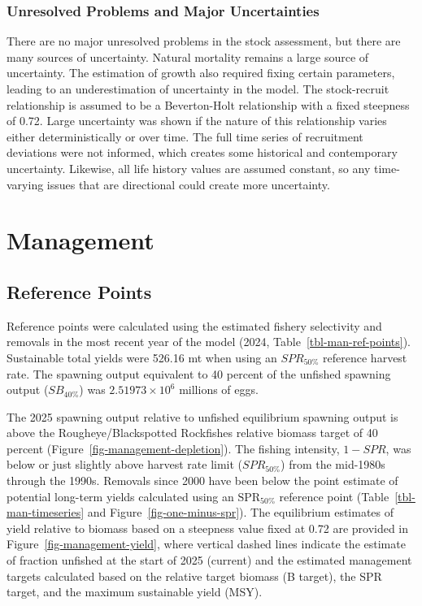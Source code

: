\documentclass[
]{scrartcl}
\begin{document}
\subsubsection{Unresolved Problems and Major
Uncertainties}\label{unresolved-problems-and-major-uncertainties-1}

There are no major unresolved problems in the stock assessment, but
there are many sources of uncertainty. Natural mortality remains a large
source of uncertainty. The estimation of growth also required fixing
certain parameters, leading to an underestimation of uncertainty in the
model. The stock-recruit relationship is assumed to be a Beverton-Holt
relationship with a fixed steepness of 0.72. Large uncertainty was shown
if the nature of this relationship varies either deterministically or
over time. The full time series of recruitment deviations were not
informed, which creates some historical and contemporary uncertainty.
Likewise, all life history values are assumed constant, so any
time-varying issues that are directional could create more uncertainty.

\newpage{}

\section{Management}\label{management}

\subsection{Reference Points}\label{reference-points-1}

Reference points were calculated using the estimated fishery selectivity
and removals in the most recent year of the model (2024,
Table~\ref{tbl-man-ref-points}). Sustainable total yields were 526.16 mt
when using an \(SPR_{50\%}\) reference harvest rate. The spawning output
equivalent to 40 percent of the unfished spawning output (\(SB_{40\%}\))
was \ensuremath{2.51973\times 10^{6}} millions of eggs.

The 2025 spawning output relative to unfished equilibrium spawning
output is above the Rougheye/Blackspotted Rockfishes relative biomass
target of 40 percent (Figure~\ref{fig-management-depletion}). The
fishing intensity, \(1-SPR\), was below or just slightly above harvest
rate limit (\(SPR_{50\%}\)) from the mid-1980s through the 1990s.
Removals since 2000 have been below the point estimate of potential
long-term yields calculated using an \(\text{SPR}_{50\%}\) reference
point (Table~\ref{tbl-man-timeseries} and
Figure~\ref{fig-one-minus-spr}). The equilibrium estimates of yield
relative to biomass based on a steepness value fixed at 0.72 are
provided in Figure~\ref{fig-management-yield}, where vertical dashed
lines indicate the estimate of fraction unfished at the start of 2025
(current) and the estimated management targets calculated based on the
relative target biomass (B target), the SPR target, and the maximum
sustainable yield (MSY).
\end{document}
